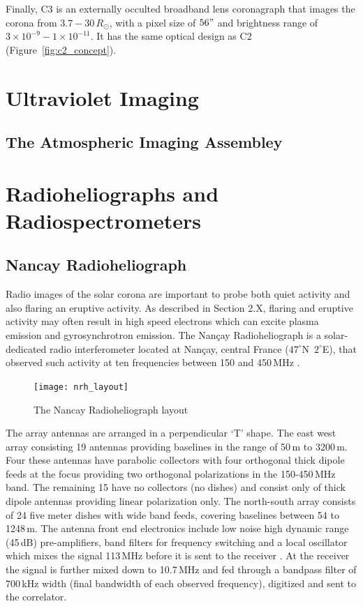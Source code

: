 Finally, C3 is an externally occulted broadband lens coronagraph that images the corona from $3.7-30\,R_{\odot}$, with a pixel size of $56"$ and brightness range of $3\times10^{-9} - 1\times10^{-11}$. It has the same optical design as C2 (Figure~\ref{fig:c2_concept}).


\section{Ultraviolet Imaging}\label{sec:4}

\subsection{The Atmospheric Imaging Assembley}\label{sec:40}

\section{Radioheliographs and Radiospectrometers}\label{sec:3}

\subsection{Nancay Radioheliograph}\label{sec:33}

Radio images of the solar corona are important to probe both quiet activity and also flaring an eruptive activity. As described in Section 2.X, flaring and eruptive activity may often result in high speed electrons which can excite plasma emission and gyrosynchrotron emission. The Nan\c{c}ay Radioheliograph is a solar-dedicated radio interferometer located at Nan\c{c}ay, central France ($47^{\circ}$N~$2^{\circ}$E), that observed such activity at ten frequencies between 150 and 450\,MHz \citep{kerdraon1997}.
\begin{figure}[t!]
\begin{center}
\texttt{[image: nrh\_layout]}
\caption[The Nancay Radioheliograph layout]{The Nancay Radioheliograph layout}
\end{center}
\label{fig:eclipse}
\end{figure}

The array antennas are arranged in a perpendicular \textquoteleft T' shape. The east west array consisting 19 antennas providing baselines in the range of 50\,m to 3200\,m. Four these antennas have parabolic collectors with four orthogonal thick dipole feeds at the focus providing two orthogonal polarizations in the 150-450\,MHz band. The remaining 15 have no collectors (no dishes) and consist only of thick dipole antennas providing linear polarization only. The north-south array consists of 24 five meter dishes with wide band feeds, covering baselines between 54 to 1248\,m. The antenna front end electronics include low noise high dynamic range (45\,dB) pre-amplifiers, band filters for frequency switching and a local oscillator which mixes the signal 113\,MHz before it is sent to the receiver \citep{avignon1989}. At the receiver the signal is further mixed down to 10.7\,MHz and fed through a bandpass filter of 700\,kHz width (final bandwidth of each observed frequency), digitized and sent to the correlator.

